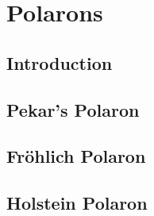 
\chapter{Polarons} %

\label{Chapter3} %



\section{Introduction}

\section{Pekar's Polaron}

\section{Fr{\"o}hlich Polaron}

\section{Holstein Polaron}


